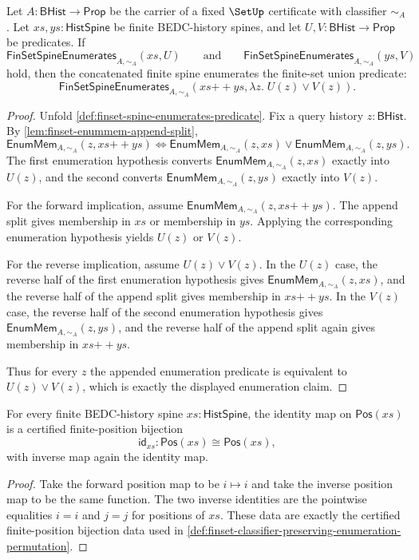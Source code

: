 \begin{theorem}
\label{thm:finset-spine-concatenation-enumerates-union}
Let $A:\mathsf{BHist}\to\mathsf{Prop}$ be the carrier of a fixed $\SetUp$ certificate with classifier $\sim_A$. Let $xs,ys:\mathsf{HistSpine}$ be finite BEDC-history spines, and let $U,V:\mathsf{BHist}\to\mathsf{Prop}$ be predicates. If
$$
\mathsf{FinSetSpineEnumerates}_{A,\sim_A}(xs,U)
\qquad\text{and}\qquad
\mathsf{FinSetSpineEnumerates}_{A,\sim_A}(ys,V)
$$
hold, then the concatenated finite spine enumerates the finite-set union predicate:
$$
\mathsf{FinSetSpineEnumerates}_{A,\sim_A}(xs{++}ys,\lambda z.\;U(z)\vee V(z)).
$$
\end{theorem}
\begin{proof}
Unfold \autoref{def:finset-spine-enumerates-predicate}. Fix a query history $z:\mathsf{BHist}$. By \autoref{lem:finset-enummem-append-split},
$$
\mathsf{EnumMem}_{A,\sim_A}(z,xs{++}ys)
\Longleftrightarrow
\mathsf{EnumMem}_{A,\sim_A}(z,xs)\vee
\mathsf{EnumMem}_{A,\sim_A}(z,ys).
$$
The first enumeration hypothesis converts $\mathsf{EnumMem}_{A,\sim_A}(z,xs)$ exactly into $U(z)$, and the second converts $\mathsf{EnumMem}_{A,\sim_A}(z,ys)$ exactly into $V(z)$.

For the forward implication, assume $\mathsf{EnumMem}_{A,\sim_A}(z,xs{++}ys)$. The append split gives membership in $xs$ or membership in $ys$. Applying the corresponding enumeration hypothesis yields $U(z)$ or $V(z)$.

For the reverse implication, assume $U(z)\vee V(z)$. In the $U(z)$ case, the reverse half of the first enumeration hypothesis gives $\mathsf{EnumMem}_{A,\sim_A}(z,xs)$, and the reverse half of the append split gives membership in $xs{++}ys$. In the $V(z)$ case, the reverse half of the second enumeration hypothesis gives $\mathsf{EnumMem}_{A,\sim_A}(z,ys)$, and the reverse half of the append split again gives membership in $xs{++}ys$.

Thus for every $z$ the appended enumeration predicate is equivalent to $U(z)\vee V(z)$, which is exactly the displayed enumeration claim.
\end{proof}

\begin{lemma}
\label{lem:finset-enum-position-identity-bijection}
For every finite BEDC-history spine $xs:\mathsf{HistSpine}$, the identity map on $\mathsf{Pos}(xs)$ is a certified finite-position bijection
$$
\mathsf{id}_{xs}:\mathsf{Pos}(xs)\cong\mathsf{Pos}(xs),
$$
with inverse map again the identity map.
\end{lemma}
\begin{proof}
Take the forward position map to be $i\mapsto i$ and take the inverse position map to be the same function. The two inverse identities are the pointwise equalities $i=i$ and $j=j$ for positions of $xs$. These data are exactly the certified finite-position bijection data used in \autoref{def:finset-classifier-preserving-enumeration-permutation}.
\end{proof}

